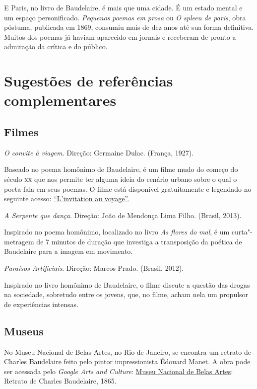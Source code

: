 \documentclass[12pt]{extarticle}
\begin{document}


E Paris, no livro de Baudelaire, é mais que uma cidade. É um estado
mental e um espaço personificado.
\emph{Pequenos poemas em prosa} ou \emph{O spleen de paris}, obra póstuma,
publicada em 1869, consumiu mais de dez anos até sua forma definitiva.
Muitos dos poemas já haviam aparecido em jornais e receberam de pronto a
admiração da crítica e do público.

\section{Sugestões de referências complementares}\label{sugestoes}

\subsection{Filmes}

\textit{O convite à viagem}. Direção: Germaine Dulac. (França, 1927).

Baseado no poema homônimo de Baudelaire, é um filme mudo do começo do século \textsc{xx}
que nos permite ter alguma ideia do cenário urbano sobre o qual o poeta fala em seus poemas.
O filme está disponível gratuitamente e legendado no seguinte acesso: \href{https://www.youtube.com/watch?v=wCZgaPcs6Y0}{``L'invitation au voyage''.}

\textit{A Serpente que dança}. Direção: João de Mendonça Lima Filho. (Brasil, 2013).

Inspirado no poema homônimo, localizado no livro \textit{As flores do mal}, é um curta"-metragem
de 7 minutos de duração que investiga a transposição da poética de Baudelaire para a imagem em movimento.

\textit{Paraísos Artificiais}. Direção: Marcos Prado. (Brasil, 2012).

Inspirado no livro homônimo de Baudelaire, o filme discute a questão das drogas na sociedade,
sobretudo entre os jovens, que, no filme, acham nela um propulsor de experiências intensas.

\subsection{Museus}

No Museu Nacional de Belas Artes, no Rio de Janeiro, se encontra um retrato de Charles 
Baudelaire feito pelo pintor impressionista Édouard Manet. A obra pode ser acessada
pelo \emph{Google Arts and Culture}: \href{https://artsandculture.google.com/asset/retrato-de-charles-baudelaire-\%C3\%89douard-manet/yAFFnToINzBuUg?hl=pt-br}{Museu Nacional de Belas Artes}: Retrato de Charles Baudelaire, 1865.
\end{document}
